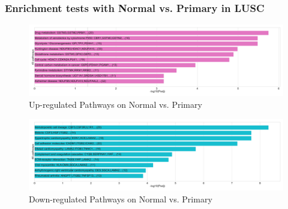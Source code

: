 \documentclass{beamer}
\begin{document}
    \begin{frame}
        \frametitle{Enrichment tests with Normal vs. Primary in LUSC}

        \begin{figure}
            \includegraphics[width=0.8 \linewidth]{figures/DEG/Enrichment/STAR.FPKM.SQC.Normal-Primary.Up.KEGG.pdf}
            \caption{Up-regulated Pathways on Normal vs. Primary}
        \end{figure}

        \begin{figure}
            \includegraphics[width=0.8 \linewidth]{figures/DEG/Enrichment/STAR.FPKM.SQC.Normal-Primary.Down.KEGG.pdf}
            \caption{Down-regulated Pathways on Normal vs. Primary}
        \end{figure}
    \end{frame}
\end{document}
